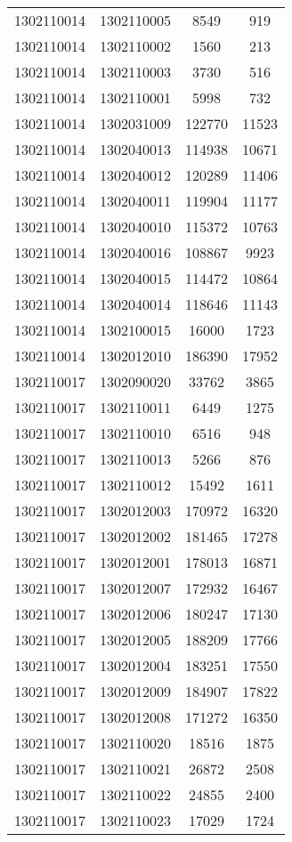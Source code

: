 \begin{longtable}{llcc}
1302110014 & 1302110005 & 8549 & 919\\
1302110014 & 1302110002 & 1560 & 213\\
1302110014 & 1302110003 & 3730 & 516\\
1302110014 & 1302110001 & 5998 & 732\\
1302110014 & 1302031009 & 122770 & 11523\\
1302110014 & 1302040013 & 114938 & 10671\\
1302110014 & 1302040012 & 120289 & 11406\\
1302110014 & 1302040011 & 119904 & 11177\\
1302110014 & 1302040010 & 115372 & 10763\\
1302110014 & 1302040016 & 108867 & 9923\\
1302110014 & 1302040015 & 114472 & 10864\\
1302110014 & 1302040014 & 118646 & 11143\\
1302110014 & 1302100015 & 16000 & 1723\\
1302110014 & 1302012010 & 186390 & 17952\\
1302110017 & 1302090020 & 33762 & 3865\\
1302110017 & 1302110011 & 6449 & 1275\\
1302110017 & 1302110010 & 6516 & 948\\
1302110017 & 1302110013 & 5266 & 876\\
1302110017 & 1302110012 & 15492 & 1611\\
1302110017 & 1302012003 & 170972 & 16320\\
1302110017 & 1302012002 & 181465 & 17278\\
1302110017 & 1302012001 & 178013 & 16871\\
1302110017 & 1302012007 & 172932 & 16467\\
1302110017 & 1302012006 & 180247 & 17130\\
1302110017 & 1302012005 & 188209 & 17766\\
1302110017 & 1302012004 & 183251 & 17550\\
1302110017 & 1302012009 & 184907 & 17822\\
1302110017 & 1302012008 & 171272 & 16350\\
1302110017 & 1302110020 & 18516 & 1875\\
1302110017 & 1302110021 & 26872 & 2508\\
1302110017 & 1302110022 & 24855 & 2400\\
1302110017 & 1302110023 & 17029 & 1724\\

\end{longtable}

